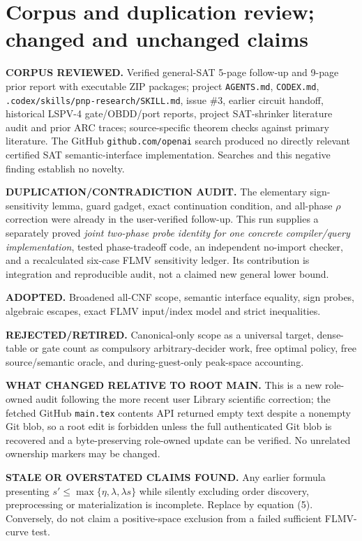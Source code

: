 \documentclass[11pt]{article}
\begin{document}
\section{Corpus and duplication review; changed and unchanged claims}
\noindent\textbf{CORPUS REVIEWED.} Verified general-SAT 5-page follow-up and 9-page prior report with executable ZIP packages; project \texttt{AGENTS.md}, \texttt{CODEX.md}, \texttt{.codex/skills/pnp-research/SKILL.md}, issue \#3, earlier circuit handoff, historical LSPV-4 gate/OBDD/port reports, project SAT-shrinker literature audit and prior ARC traces; source-specific theorem checks against primary literature. The GitHub \texttt{github.com/openai} search produced no directly relevant certified SAT semantic-interface implementation. Searches and this negative finding establish no novelty.\par
\noindent\textbf{DUPLICATION/CONTRADICTION AUDIT.} The elementary sign-sensitivity lemma, guard gadget, exact continuation condition, and all-phase $\rho$ correction were already in the user-verified follow-up. This run supplies a separately proved \emph{joint two-phase probe identity for one concrete compiler/query implementation}, tested phase-tradeoff code, an independent no-import checker, and a recalculated six-case FLMV sensitivity ledger. Its contribution is integration and reproducible audit, not a claimed new general lower bound.\par
\noindent\textbf{ADOPTED.} Broadened all-CNF scope, semantic interface equality, sign probes, algebraic escapes, exact FLMV input/index model and strict inequalities.\par
\noindent\textbf{REJECTED/RETIRED.} Canonical-only scope as a universal target, dense-table or gate count as compulsory arbitrary-decider work, free optimal policy, free source/semantic oracle, and during-guest-only peak-space accounting.\par
\noindent\textbf{WHAT CHANGED RELATIVE TO ROOT MAIN.} This is a new role-owned audit following the more recent user Library scientific correction; the fetched GitHub \texttt{main.tex} contents API returned empty text despite a nonempty Git blob, so a root edit is forbidden unless the full authenticated Git blob is recovered and a byte-preserving role-owned update can be verified. No unrelated ownership markers may be changed.\par
\noindent\textbf{STALE OR OVERSTATED CLAIMS FOUND.} Any earlier formula presenting $s'\le\max\{\eta,\lambda,\lambda s\}$ while silently excluding order discovery, preprocessing or materialization is incomplete. Replace by equation (5). Conversely, do not claim a positive-space exclusion from a failed sufficient FLMV-curve test.
\end{document}
